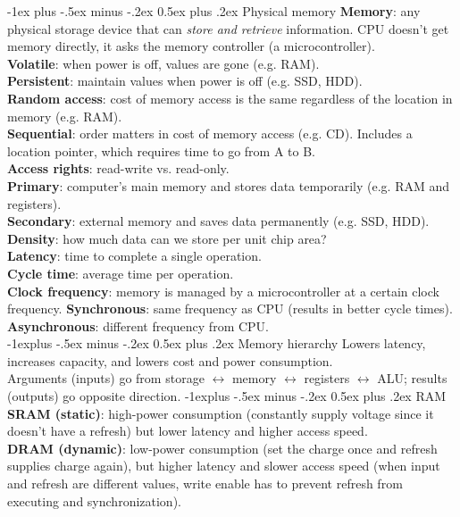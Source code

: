 \documentclass[10pt,landscape]{article}
\makeatletter
\renewcommand{\section}{\@startsection{section}{1}{0mm}%
                                {-1ex plus -.5ex minus -.2ex}%
                                {0.5ex plus .2ex}%
                                {\normalfont\small\bfseries}}
\renewcommand{\subsection}{\@startsection{subsection}{2}{0mm}%
                                {-1explus -.5ex minus -.2ex}%
                                {0.5ex plus .2ex}%
                                {\normalfont\scriptsize\bfseries}}
\makeatother
\begin{document}
\begin{multicols}{3}
\section{Physical memory}
\textbf{Memory}: any physical storage device that can \textit{store and retrieve} information. CPU doesn't get memory directly, it asks the memory controller (a microcontroller).\\
\textbf{Volatile}: when power is off, values are gone (e.g. RAM).\\
\textbf{Persistent}: maintain values when power is off (e.g. SSD, HDD).\\
\textbf{Random access}: cost of memory access is the same regardless of the location in memory (e.g. RAM).\\
\textbf{Sequential}: order matters in cost of memory access (e.g. CD). Includes a location pointer, which requires time to go from A to B.\\
\textbf{Access rights}: read-write vs. read-only.\\ 
\textbf{Primary}: computer's main memory and stores data temporarily (e.g. RAM and registers).\\
\textbf{Secondary}: external memory and saves data permanently (e.g. SSD, HDD).\\
\textbf{Density}: how much data can we store per unit chip area?\\
\textbf{Latency}: time to complete a single operation.\\
\textbf{Cycle time}: average time per operation.\\
\textbf{Clock frequency}: memory is managed by a microcontroller at a certain clock frequency.
\textbf{Synchronous}: same frequency as CPU (results in better cycle times).\\
\textbf{Asynchronous}: different frequency from CPU.\\
\subsection{Memory hierarchy}
Lowers latency, increases capacity, and lowers cost and power consumption.\\
Arguments (inputs) go from storage $\leftrightarrow$ memory $\leftrightarrow$ registers $\leftrightarrow$ ALU; results (outputs) go opposite direction.
\subsection{RAM}
\textbf{SRAM (static)}: high-power consumption (constantly supply voltage since it doesn't have a refresh) but lower latency and higher access speed.\\
\textbf{DRAM (dynamic)}: low-power consumption (set the charge once and refresh supplies charge again), but higher latency and slower access speed (when input and refresh are different values, write enable has to prevent refresh from executing and synchronization).

\end{multicols}
\end{document}
